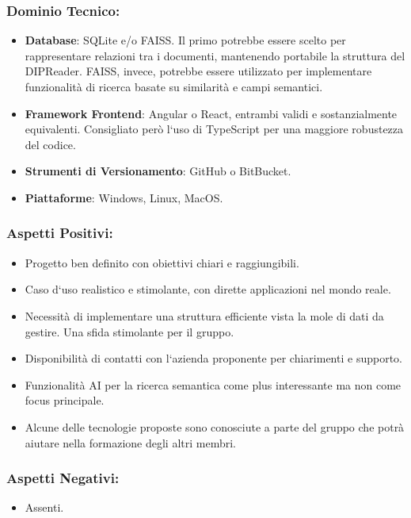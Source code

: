 \documentclass[a4paper,12pt]{article}
\begin{document}
\subsubsection*{Dominio Tecnico:}
\begin{itemize}
    \item \textbf{Database}: SQLite e/o FAISS. Il primo potrebbe essere scelto per rappresentare relazioni tra i documenti, mantenendo portabile la struttura del DIPReader. FAISS, invece, potrebbe essere utilizzato per implementare funzionalità di ricerca basate su similarità e campi semantici.
    \item \textbf{Framework Frontend}: Angular o React, entrambi validi e sostanzialmente equivalenti. Consigliato però l`uso di TypeScript per una maggiore robustezza del codice.
    \item \textbf{Strumenti di Versionamento}: GitHub o BitBucket.
    \item \textbf{Piattaforme}: Windows, Linux, MacOS.
\end{itemize}
\subsubsection*{Aspetti Positivi:}
\begin{itemize}
    \item Progetto ben definito con obiettivi chiari e raggiungibili.
    \item Caso d`uso realistico e stimolante, con dirette applicazioni nel mondo reale.
    \item Necessità di implementare una struttura efficiente vista la mole di dati da
          gestire. Una sfida stimolante per il gruppo.
    \item Disponibilità di contatti con l`azienda proponente per chiarimenti e supporto.
    \item Funzionalità AI per la ricerca semantica come plus interessante ma non come
          focus principale.
    \item Alcune delle tecnologie proposte sono conosciute a parte del gruppo che potrà
          aiutare nella formazione degli altri membri.
\end{itemize}

\subsubsection*{Aspetti Negativi:}
\begin{itemize}
    \item Assenti.
\end{itemize}
\end{document}
